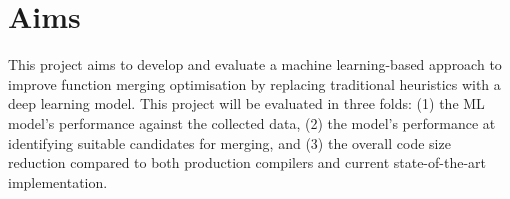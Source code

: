 \section{Aims} \label{section:aims}





This project aims to develop and evaluate a machine learning-based approach to improve function merging optimisation by replacing traditional heuristics with a deep learning model. This project will be evaluated in three folds: (1) the ML model's performance against the collected data, (2) the model's performance at identifying suitable candidates for merging, and (3)  the overall code size reduction compared to both production compilers and current state-of-the-art implementation.

